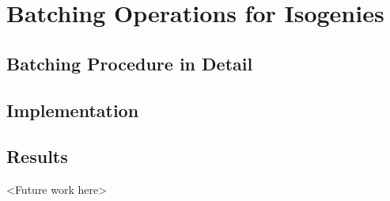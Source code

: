 \chapter{Batching Operations for Isogenies}

\section{Batching Procedure in Detail}

\section{Implementation}

\section{Results}

<Future work here>
